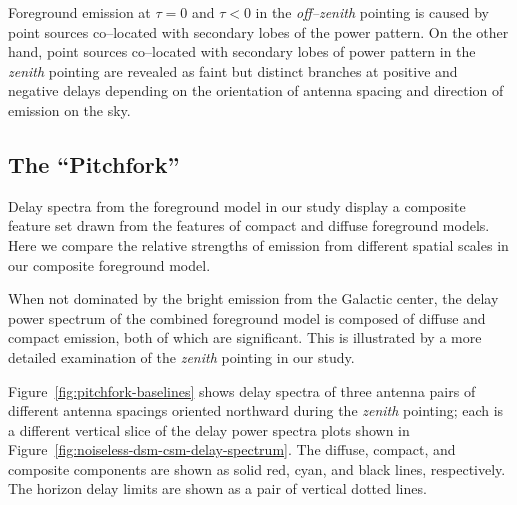 \documentclass[preprint2,iop,numberedappendix,twocolappendix,appendixfloats]{emulateapj}
\begin{document}
Foreground emission at $\tau=0$ and $\tau<0$ in the {\it off--zenith} pointing is caused by point sources co--located with secondary lobes of the power pattern. On the other hand, point sources co--located with secondary lobes of power pattern in the {\it zenith} pointing are revealed as faint but distinct branches at positive and negative delays depending on the orientation of antenna spacing and direction of emission on the sky. 

\subsection{The ``Pitchfork''}\label{sec:composite}

Delay spectra from the foreground model in our study display a composite feature set drawn from the features of compact and diffuse foreground models. Here we compare the relative strengths of emission from different spatial scales in our composite foreground model. 

When not dominated by the bright emission from the Galactic center, the delay power spectrum of the combined foreground model is composed of diffuse and compact emission, both of which are significant. This is illustrated by a more detailed examination of the {\it zenith} pointing in our study. 

Figure~\ref{fig:pitchfork-baselines} shows delay spectra of three antenna pairs of different antenna spacings oriented northward during the {\it zenith} pointing; each is a different vertical slice of the delay power spectra plots shown in Figure~\ref{fig:noiseless-dsm-csm-delay-spectrum}. The diffuse, compact, and composite components are shown as solid red, cyan, and black lines, respectively. The horizon delay limits are shown as a pair of vertical dotted lines. 
\end{document}
